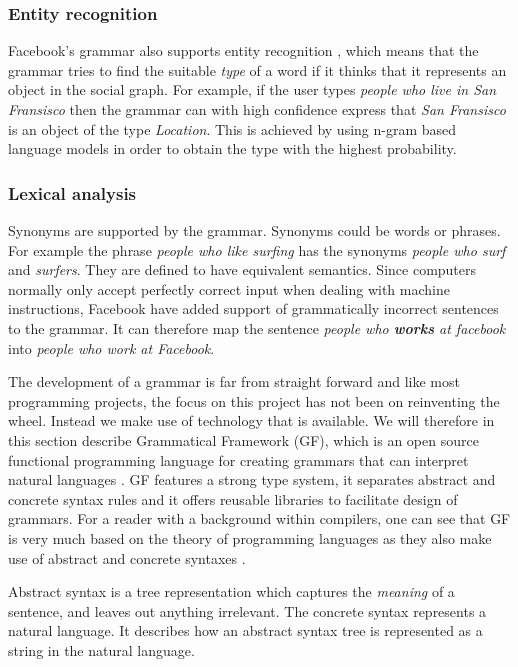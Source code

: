 \subsubsection{Entity recognition}
Facebook's grammar also supports entity recognition \cite{citation-needed}, which means that the grammar tries to find the suitable \emph{type} of a word if it thinks that it represents an object in the social graph. For example, if the user types \emph{people who live in San Fransisco} then the grammar can with high confidence express that \emph{San Fransisco} is an object of the type \emph{Location}. This is achieved by using n-gram based language models in order to obtain the type with the highest probability.

\subsubsection{Lexical analysis}
Synonyms are supported by the grammar. Synonyms could be words or phrases. For example the phrase \emph{people who like surfing} has the synonyms \emph{people who surf} and \emph{surfers}. They are defined to have equivalent semantics.
\newline
\newline
Since computers normally only accept perfectly correct input when dealing with machine instructions, Facebook have added support of grammatically incorrect sentences to the grammar. It can therefore map the sentence \emph{people who \textbf{works} at facebook} into \emph{people who work at Facebook}.

The development of a grammar is far from straight forward and like most programming projects, the focus on this project has not been on reinventing the wheel. Instead we make use of technology that is available. We will therefore in this section describe Grammatical Framework (GF), which is an open source functional programming language for creating grammars that can interpret natural languages \cite[p. 1]{ranta:2011}. GF features a strong type system, it separates abstract and concrete syntax rules and it offers reusable libraries to facilitate design of grammars. For a reader with a background within compilers, one can see that GF is very much based on the theory of programming languages as they also make use of abstract and concrete syntaxes \cite[pp. 69-70]{Aho:1986:CPT:6448}.

Abstract syntax is a tree representation which captures the \emph{meaning} of a sentence, and leaves out anything irrelevant. The concrete syntax represents a natural language. It describes how an abstract syntax tree is represented as a string in the natural language.

